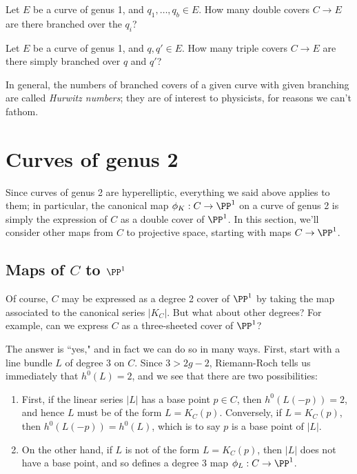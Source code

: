\begin{exercise} Let $E$ be a curve of genus 1, and $q_1,\dots,q_b \in E$. How many double covers $C \to E$ are there branched over the $q_i$?
\end{exercise}


\begin{exercise} Let $E$ be a curve of genus 1, and $q, q' \in E$. How many triple covers $C \to E$ are there simply branched over $q$ and $q'$?
\end{exercise}


In general, the numbers of branched covers of a given curve with given branching are called \emph{Hurwitz numbers}; they are of interest to physicists, for reasons we can't fathom.



\section{Curves of genus 2}


Since  curves of genus 2 are hyperelliptic, everything we said above applies to them; in particular, the canonical map $\phi_K : C \to \PP^1$ on a curve of genus 2 is simply the expression of $C$ as a double cover of $\PP^1$. In this section, we'll consider other maps from $C$ to projective space, starting with maps $C \to \PP^1$.

\subsection{Maps of $C$ to $\PP^1$}\label{genus 2 pencil}

Of course, $C$ may be expressed as a degree 2 cover of $\PP^1$ by taking the map associated to the canonical series $|K_C|$. But what about other degrees? For example, can we express $C$ as a three-sheeted cover of $\PP^1$?

The answer is ``yes," and in fact we can do so in many ways. First, start with a line bundle $L$ of degree 3 on $C$. Since $3 > 2g-2$, Riemann-Roch tells us immediately that $h^0(L) = 2$, and we see that there are two possibilities:

\begin{enumerate}
\item First, if the linear series $|L|$ has a base point $p \in C$, then $h^0(L(-p)) = 2$, and hence $L$ must be of the form $L = K_C(p)$. Conversely, if $L = K_C(p)$, then $h^0(L(-p)) = h^0(L)$, which is to say $p$ is a base point of $|L|$.
\item On the other hand, if $L$ is not of the form $L = K_C(p)$, then $|L|$ does not have a base point, and so defines a degree 3 map $\phi_L : C \to \PP^1$.
\end{enumerate}

